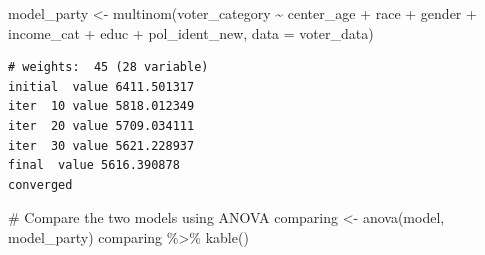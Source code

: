 \documentclass[
  letterpaper,
  DIV=11,
  numbers=noendperiod]{scrartcl}
\newenvironment{Shaded}{\begin{snugshade}}{\end{snugshade}}
\newcommand{\AttributeTok}[1]{\textcolor[rgb]{0.40,0.45,0.13}{#1}}
\newcommand{\CommentTok}[1]{\textcolor[rgb]{0.37,0.37,0.37}{#1}}
\newcommand{\FunctionTok}[1]{\textcolor[rgb]{0.28,0.35,0.67}{#1}}
\newcommand{\NormalTok}[1]{\textcolor[rgb]{0.00,0.23,0.31}{#1}}
\newcommand{\OtherTok}[1]{\textcolor[rgb]{0.00,0.23,0.31}{#1}}
\newcommand{\SpecialCharTok}[1]{\textcolor[rgb]{0.37,0.37,0.37}{#1}}
\begin{document}
\begin{Shaded}
\begin{Highlighting}[]
\NormalTok{model\_party }\OtherTok{\textless{}{-}} \FunctionTok{multinom}\NormalTok{(voter\_category }\SpecialCharTok{\textasciitilde{}}\NormalTok{ center\_age }\SpecialCharTok{+}\NormalTok{ race }\SpecialCharTok{+}\NormalTok{ gender }\SpecialCharTok{+}\NormalTok{ income\_cat }\SpecialCharTok{+}\NormalTok{ educ }\SpecialCharTok{+}\NormalTok{ pol\_ident\_new, }\AttributeTok{data =}\NormalTok{ voter\_data)}
\end{Highlighting}
\end{Shaded}

\begin{verbatim}
# weights:  45 (28 variable)
initial  value 6411.501317 
iter  10 value 5818.012349
iter  20 value 5709.034111
iter  30 value 5621.228937
final  value 5616.390878 
converged
\end{verbatim}

\begin{Shaded}
\begin{Highlighting}[]
\CommentTok{\# Compare the two models using ANOVA}
\NormalTok{comparing }\OtherTok{\textless{}{-}} \FunctionTok{anova}\NormalTok{(model, model\_party)}
\NormalTok{comparing }\SpecialCharTok{\%\textgreater{}\%}
  \FunctionTok{kable}\NormalTok{()}
\end{Highlighting}
\end{Shaded}
\end{document}
